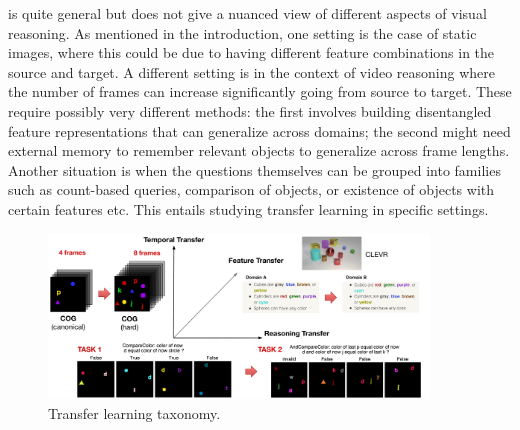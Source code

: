  is quite general but does not give a nuanced view of different aspects of visual reasoning.
As mentioned in the introduction, one setting is the case of static images,
where this could be due to having different feature combinations in the source and target.
A different setting is in the context of video reasoning where the number of frames can increase significantly going from source to target.
These require possibly very different methods: the first involves building disentangled feature representations that can generalize across
domains; the second might need external memory to remember relevant objects to generalize across frame lengths.
Another situation is when the questions themselves can be grouped into families such as count-based queries,
comparison of objects, or existence of objects with certain features etc.
This entails studying transfer learning in specific settings.

\begin{figure}[!t]
	\centering
	\includegraphics[width=0.9\textwidth]{../img/architecture/transfer_taxo}
	\caption{Transfer learning taxonomy.}
	\label{fig:taskonomy}\vspace{-10pt}
\end{figure}

